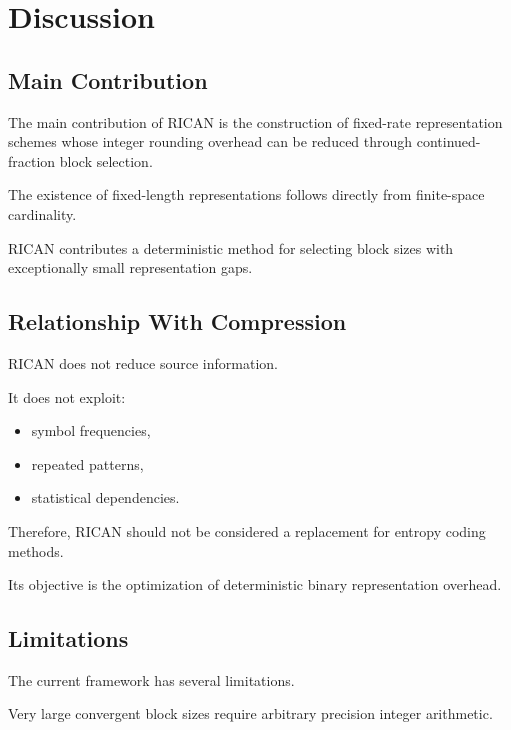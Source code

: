 \documentclass[onecolumn]{IEEEtran}
\begin{document}

\section{Discussion}

\subsection{Main Contribution}

The main contribution of RICAN is the construction of fixed-rate
representation schemes whose integer rounding overhead can be reduced
through continued-fraction block selection.

The existence of fixed-length representations follows directly from
finite-space cardinality.

RICAN contributes a deterministic method for selecting block sizes with
exceptionally small representation gaps.

\subsection{Relationship With Compression}

RICAN does not reduce source information.

It does not exploit:

\begin{itemize}

\item symbol frequencies,

\item repeated patterns,

\item statistical dependencies.

\end{itemize}

Therefore, RICAN should not be considered a replacement for entropy
coding methods.

Its objective is the optimization of deterministic binary
representation overhead.

\subsection{Limitations}

The current framework has several limitations.

Very large convergent block sizes require arbitrary precision integer
arithmetic.
\end{document}
